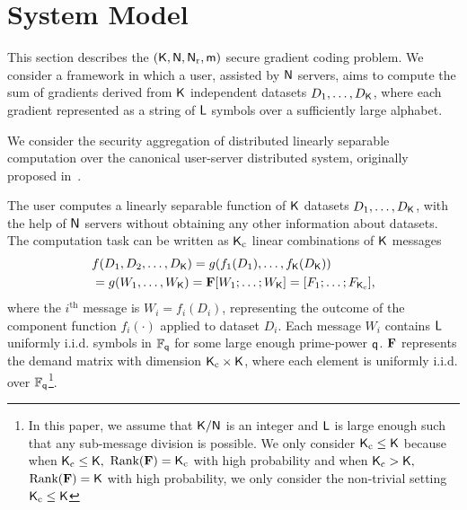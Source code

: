 \documentclass[conference,letterpaper]{IEEEtran}
\begin{document}
\section{System Model}
\label{sec:system}
This section describes the $({\sf K},{\sf N},{\sf N}_{\rm r}, {\sf m})$ secure gradient coding problem. 
We consider a framework in which a user, assisted by ${\sf N}$ servers, aims to compute the sum of gradients derived from ${\sf K}$ independent datasets $D_1,\ldots, D_{{\sf K}}$, where each gradient represented as a string of ${\sf L}$ symbols over a sufficiently large alphabet. %

\iffalse
We consider the security aggregation of distributed linearly separable computation over the canonical user-server distributed system, originally proposed in~\cite{wan2022secure}. 

The user computes a linearly separable function of ${\sf K}$  datasets $D_1, \ldots, D_{{\sf K}}$, with the help of ${\sf N}$ servers without obtaining any other information about datasets. The computation task can be written as ${\sf K}_{\rm c}$ linear combinations of ${\sf K}$ messages
\begin{align}
    &f({D_1},{D_2}, \ldots ,{D_{{\sf K}}}) = g({f_1}({D_1}), \ldots ,{f_{{\sf K}}}({D_{{\sf K}}}))  \nonumber\\
    &= g({W_1}, \ldots ,{W_{{\sf K}}}) = {\bf F}[{W_1}; \ldots ;{W_{\sf K}}] = [{F_1};\ldots;{F_{{\sf K}_{\rm c}}}], \label{eq:computation task}
\end{align}
where the $i^{\text{th}}$ message is  ${W_i} = {f_i}({D_i}) $, representing  the outcome of the  component function $f_i(\cdot)$ applied to dataset $D_i$. Each message $W_i$ contains ${\sf L}$ uniformly i.i.d. symbols in $\mathbb{F}_{{\sf q}}$ for some large enough prime-power ${\sf q}$. ${\bf F}$ represents the demand matrix with dimension ${\sf K}_{\rm c} \times {\sf K}$, where each element is uniformly i.i.d. over $\mathbb{F}_{{\sf q}}$\footnote{\label{foot:L large}In this paper, we assume that  ${\sf K}/{\sf N}$ is an integer and  ${\sf L}$ is large enough such
that any sub-message division is possible. We only consider ${\sf K}_{\rm c} \leq {\sf K}$ because when ${\sf K}_{\rm c} \le {\sf K},$  $\text{Rank}({\bf F}) = {\sf K}_{\rm c}$ with high probability and when ${\sf K}_{\rm c} > {\sf K},$ $\text{Rank}({\bf F}) = {\sf K}$ with high probability, we only consider the non-trivial setting ${\sf K}_{\rm c} \le {\sf K}$}. 
\end{document}
